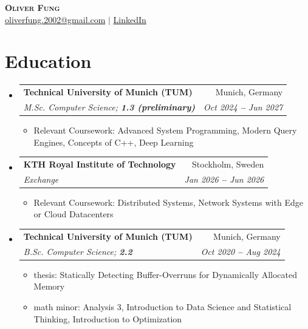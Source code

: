 \documentclass[letterpaper,11pt]{article}
\makeatletter
\newcommand{\resumeItem}[1]{
  \item\small{
    {#1 \vspace{-2pt}}
  }
}
\newcommand{\resumeSubheading}[4]{
  \vspace{-2pt}\item
    \begin{tabular*}{0.97\textwidth}[t]{l@{\extracolsep{\fill}}r}
      \textbf{#1} & #2 \\
      \textit{\small#3} & \textit{\small #4} \\
    \end{tabular*}\vspace{-7pt}
}
\newcommand{\resumeSubHeadingListStart}{\begin{itemize}[leftmargin=0.15in, label={}]}
\newcommand{\resumeSubHeadingListEnd}{\end{itemize}}
\newcommand{\resumeItemListStart}{\begin{itemize}}
\newcommand{\resumeItemListEnd}{\end{itemize}\vspace{-5pt}}
\makeatother
\begin{document}

\begin{center}
    \textbf{\Huge \scshape Oliver Fung} \\ \vspace{3pt}
    \small
    \faAt \hspace{.5pt} \href{mailto:oliverfung.2002@gmail.com}{oliverfung.2002@gmail.com}
    $|$
    \faLinkedinSquare \hspace{.5pt} \href{https://www.linkedin.com/in/oliver-f-25b20318a}{LinkedIn}
\end{center}




\section{Education}
  \vspace{3pt}
  \resumeSubHeadingListStart
    \resumeSubheading
      {
        Technical University of Munich (TUM)
      }{Munich, Germany}
      {M.Sc. Computer Science;   \textbf{1.3 (preliminary)}}{Oct 2024 \textbf{--} Jun 2027}
        \resumeItemListStart
            \resumeItem{Relevant Coursework: Advanced System Programming, Modern Query Engines, Concepts of C++, Deep Learning}
        \resumeItemListEnd
    \resumeSubheading
      {
      KTH Royal Institute of Technology
      }{Stockholm, Sweden}
      {Exchange}{Jan 2026 \textbf{--} Jun 2026}
        \resumeItemListStart
            \resumeItem{Relevant Coursework: Distributed Systems,  Network Systems with Edge or Cloud Datacenters}
        \resumeItemListEnd
    \resumeSubheading
      { 
        Technical University of Munich (TUM)
      }{Munich, Germany}
      {B.Sc. Computer Science;   \textbf{2.2}}{Oct 2020 \textbf{--} Aug 2024}
        \resumeItemListStart
            \resumeItem{
            thesis: Statically Detecting Buffer-Overruns for Dynamically Allocated Memory           }
          \resumeItem{math minor: Analysis 3, Introduction to Data Science and Statistical Thinking, Introduction to Optimization}
        \resumeItemListEnd
  \resumeSubHeadingListEnd



\end{document}
